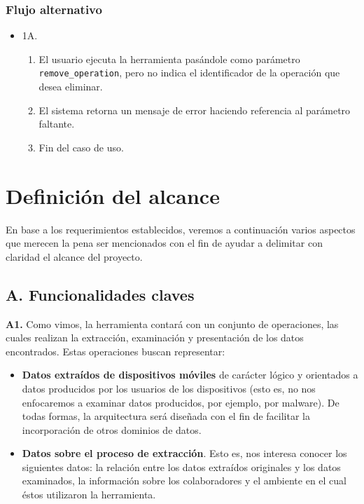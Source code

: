 \subsubsection*{Flujo alternativo}
\begin{itemize}
\item 1A.
    \begin{enumerate}
    \item \begin{sloppypar} El usuario ejecuta la herramienta pasándole como parámetro \texttt{remove\_operation}, pero no indica el identificador de la operación que desea eliminar. \end{sloppypar}
    \item El sistema retorna un mensaje de error haciendo referencia al parámetro faltante.
    \item Fin del caso de uso.
    \end{enumerate}
\end{itemize}

\section{Definición del alcance}
En base a los requerimientos establecidos, veremos a continuación varios aspectos que merecen la pena ser mencionados con el fin de ayudar a delimitar con claridad el alcance del proyecto.

\subsection*{A. Funcionalidades claves}
\textbf{A1.} Como vimos, la herramienta contará con un conjunto de operaciones, las cuales realizan la extracción, examinación y presentación de los datos encontrados. Estas operaciones buscan representar:

\begin{itemize}
\item \textbf{Datos extraídos de dispositivos móviles} de carácter lógico y orientados a datos producidos por los usuarios de los dispositivos (esto es, no nos enfocaremos a examinar datos producidos, por ejemplo, por malware). De todas formas, la arquitectura será diseñada con el fin de facilitar la incorporación de otros dominios de datos.
\item \textbf{Datos sobre el proceso de extracción}. Esto es, nos interesa conocer los siguientes datos: la relación entre los datos extraídos originales y los datos examinados, la información sobre los colaboradores y el ambiente en el cual éstos utilizaron la herramienta.
\end{itemize}

